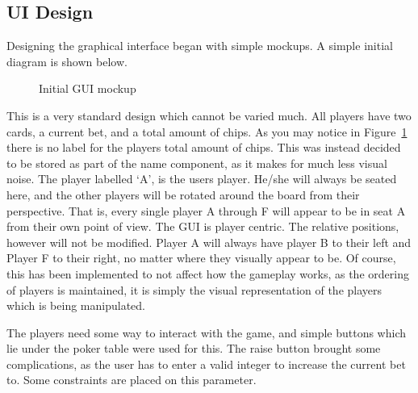 \subsection{UI Design}
Designing the graphical interface began with simple mockups. A simple
initial diagram is shown below.

\begin{figure}[h]
    \caption{Initial GUI mockup}%
    \label{fig:initialgui}
\end{figure}

This is a very standard design which cannot be varied much. All players have
two cards, a current bet, and a total amount of chips. As you may notice
in Figure~\ref{fig:initialgui} there is no label for the players total amount
of chips. This was instead decided to be stored as part of the name component,
as it makes for much less visual noise. The player labelled `A', is the
users player. He/she will always be seated here, and the other players will
be rotated around the board from their perspective. That is, every single
player A through F will appear to be in seat A from their own point of view.
The GUI is player centric. The relative positions, however will not be 
modified. Player A will always have player B to their left and Player F to 
their right, no matter where they visually appear to be. Of course, this has 
been implemented to not affect how the gameplay works, as the ordering of 
players is maintained, it is simply the visual representation of the players 
which is being manipulated.

The players need some way to interact with the game, and simple buttons which 
lie under the poker table were used for this. The raise button brought some 
complications, as the user has to enter a valid integer to increase the current
bet to. Some constraints are placed on this parameter.

